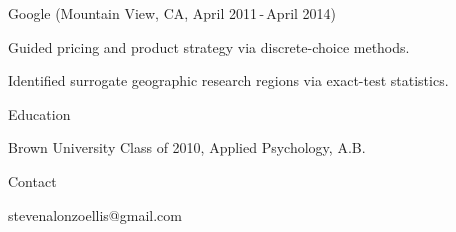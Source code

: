 \documentclass[12pt]{res}
\begin{document}
{\begin{resume}
\begin{minipage}{7.9in}
\begin{list}{}{\leftmargin=0em}
{\begin{list}{-}{\leftmargin=1em}
\item{Google (Mountain View, CA, April  2011\,-\,April  2014)
\begin{list}{--}{\leftmargin=1em}
\item Guided pricing and product strategy via discrete-choice methods.
\item Identified surrogate geographic research regions via exact-test statistics.
\end{list}}
\end{list}}

\item{Education\dotfill 
\begin{list}{-}{\leftmargin=1em}
\item Brown University Class of 2010, Applied Psychology, A.B.
\end{list}}

\item{Contact\dotfill 
\begin{list}{-}{\leftmargin=1em}
\item stevenalonzoellis@gmail.com
\end{list}}
\end{list}

\vspace{3.35in}


\end{minipage}
\end{resume}
} %
\end{document}
